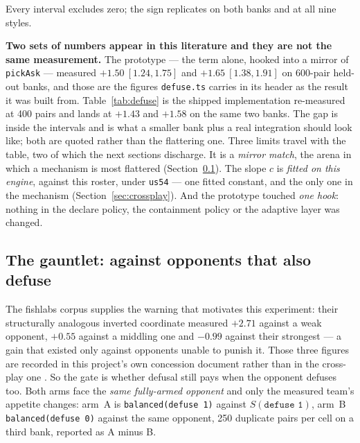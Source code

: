 \documentclass[11pt]{article}
\newcommand{\code}[1]{\texttt{#1}}
\newcommand{\usff}{\code{us54}}
\begin{document}
Every interval excludes zero; the sign replicates on both banks and at all nine styles.

\textbf{Two sets of numbers appear in this literature and they are not the same measurement.} The
prototype --- the term alone, hooked into a mirror of \code{pickAsk} --- measured $+1.50\ [1.24,
1.75]$ and $+1.65\ [1.38, 1.91]$ on 600-pair held-out banks, and those are the figures
\code{defuse.ts} carries in its header as the result it was built from. Table~\ref{tab:defuse} is
the shipped implementation re-measured at 400 pairs and lands at $+1.43$ and $+1.58$ on the same two
banks. The gap is inside the intervals and is what a smaller bank plus a real integration should
look like; both are quoted rather than the flattering one. Three limits travel with the table, two
of which the next sections discharge. It is a \emph{mirror match}, the arena in which a mechanism is
most flattered (Section~\ref{sec:gauntlet}). The slope $c$ is \emph{fitted on this engine}, against
this roster, under \usff{} --- one fitted constant, and the only one in the mechanism
(Section~\ref{sec:crossplay}). And the prototype touched \emph{one hook}: nothing in the declare
policy, the containment policy or the adaptive layer was changed.

\subsection{The gauntlet: against opponents that also defuse}
\label{sec:gauntlet}

The fishlabs corpus supplies the warning that motivates this experiment: their structurally
analogous inverted coordinate measured $+2.71$ against a weak opponent, $+0.55$ against a middling
one and $-0.99$ against their strongest --- a gain that existed only against opponents unable to
punish it. Those three figures are recorded in this project's own concession document rather than in
the cross-play one \cite{concession}. So the gate is whether defusal still pays when the opponent
defuses too. Both arms face the \emph{same fully-armed opponent} and only the measured team's
appetite changes: arm~A is \code{balanced(defuse 1)} against $S(\code{defuse 1})$, arm~B
\code{balanced(defuse 0)} against the same opponent, 250 duplicate pairs per cell on a third bank,
reported as A minus B.
\end{document}
